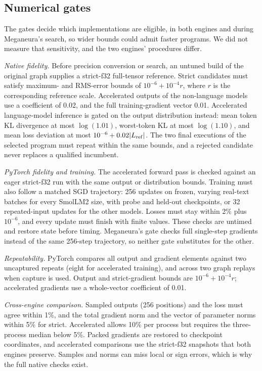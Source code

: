 \documentclass[conference]{IEEEtran}
\newcommand{\system}{Meganeura}
\begin{document}
\subsection{Numerical gates}
\label{sec:gates}

The gates decide which implementations are eligible, in both engines and
during \system{}'s search, so wider bounds could admit faster programs. We
did not measure that sensitivity, and the two engines' procedures differ.

\emph{Native fidelity.} Before precision conversion or search, an untuned
build of the original graph supplies a strict-f32 full-tensor reference.
Strict candidates must satisfy maximum- and RMS-error bounds of
$10^{-6}+10^{-4}r$, where $r$ is the corresponding reference scale.
Accelerated outputs of the non-language models use a coefficient of 0.02, and
the full training-gradient vector 0.01. Accelerated language-model inference
is gated on the output distribution instead: mean token KL divergence at most
$\log(1.01)$, worst-token KL at most $\log(1.10)$, and mean loss deviation at
most $10^{-6}+0.02|L_{\rm ref}|$. The two final executions of the selected
program must repeat within the same bounds, and a rejected candidate never
replaces a qualified incumbent.

\emph{PyTorch fidelity and training.} The accelerated forward pass is checked
against an eager strict-f32 run with the same output or distribution bounds.
Training must also follow a matched SGD trajectory: 256 updates on frozen,
varying real-text batches for every SmolLM2 size, with probe and held-out
checkpoints, or 32 repeated-input updates for the other models. Losses must
stay within 2\% plus $10^{-6}$, and every update must finish with finite
values. These checks are untimed and restore state before timing. \system{}'s
gate checks full single-step gradients instead of the same 256-step
trajectory, so neither gate substitutes for the other.

\emph{Repeatability.} PyTorch compares all output and gradient elements
against two uncaptured repeats (eight for accelerated training), and across two
graph replays when capture is used. Output and strict-gradient bounds are
$10^{-6}+10^{-4}r$; accelerated gradients use a whole-vector coefficient of
0.01.

\emph{Cross-engine comparison.} Sampled outputs (256 positions) and the loss
must agree within 1\%, and the total gradient norm and the vector of
parameter norms within 5\% for strict. Accelerated allows 10\% per process
but requires the three-process median below 5\%. Packed gradients are
restored to checkpoint coordinates, and accelerated comparisons use the
strict-f32 snapshots that both engines preserve. Samples and norms can miss
local or sign errors, which is why the full native checks exist.
\end{document}
